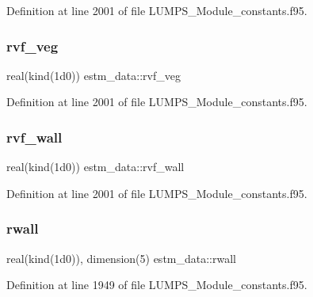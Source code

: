 Definition at line 2001 of file L\+U\+M\+P\+S\+\_\+\+Module\+\_\+constants.\+f95.

\mbox{\label{namespaceestm__data_ab7bfb1808a01900faec78277f5baab8e}} 
\subsubsection{\texorpdfstring{rvf\+\_\+veg}{rvf\_veg}}
{\footnotesize\ttfamily real(kind(1d0)) estm\+\_\+data\+::rvf\+\_\+veg}



Definition at line 2001 of file L\+U\+M\+P\+S\+\_\+\+Module\+\_\+constants.\+f95.

\mbox{\label{namespaceestm__data_afe15d5484c54bc270928313b67cd282f}} 
\subsubsection{\texorpdfstring{rvf\+\_\+wall}{rvf\_wall}}
{\footnotesize\ttfamily real(kind(1d0)) estm\+\_\+data\+::rvf\+\_\+wall}



Definition at line 2001 of file L\+U\+M\+P\+S\+\_\+\+Module\+\_\+constants.\+f95.

\mbox{\label{namespaceestm__data_a76d29d9454cc82038e887a185e8e0c08}} 
\subsubsection{\texorpdfstring{rwall}{rwall}}
{\footnotesize\ttfamily real(kind(1d0)), dimension(5) estm\+\_\+data\+::rwall}



Definition at line 1949 of file L\+U\+M\+P\+S\+\_\+\+Module\+\_\+constants.\+f95.

\mbox{\label{namespaceestm__data_aba856f5539c396e0cf8f9b6fafef6511}} 
